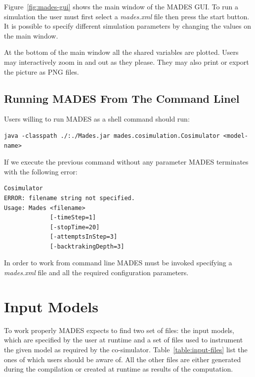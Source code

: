 \documentclass{kapproc} %
\begin{document}
Figure~\ref{fig:mades-gui} shows the main window of the MADES GUI. To run a simulation the user must first select a \emph{mades.xml} file then press the start button. It is possible to specify different simulation parameters by changing the values on the main window.

At the bottom of the main window all the shared variables are plotted. Users may interactively zoom in and out as they please. They may also print or export the picture as PNG files.

\subsection{Running MADES From The Command Linel}

Users willing to run MADES as a shell command should run:\\
\begin{verbatim}
java -classpath ./:./Mades.jar mades.cosimulation.Cosimulator <model-name>
\end{verbatim}

If we execute the previous command without any parameter MADES terminates with the following error:\\
\begin{verbatim}
Cosimulator
ERROR: filename string not specified.
Usage: Mades <filename> 
             [-timeStep=1] 
             [-stopTime=20] 
             [-attemptsInStep=3] 
             [-backtrakingDepth=3]
\end{verbatim}
In order to work from command line MADES must be invoked specifying a \emph{mades.xml} file and all the required configuration parameters.

\section{Input Models}
\label{section:input-models}

To work properly MADES expects to find two set of files: the input models, which are specified by the user at runtime and a set of files used to instrument the given model as required by the co-simulator. Table~\ref{table:input-files} list the ones of which users should be aware of. All the other files are either generated during the compilation or created at runtime as results of the computation.
\end{document}
